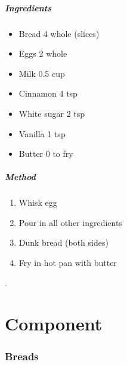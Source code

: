 \documentclass[]{article}
\begin{document}
\subsubsection*{\Large Ingredients}
\begin{multicols}{2}
\begin{itemize}
 \item Bread \hfill 4 whole (slices)
 \item Eggs \hfill 2 whole
 \item Milk \hfill 0.5 cup
 \item Cinnamon \hfill 4 tsp
 \item White sugar \hfill 2 tsp
 \item Vanilla \hfill 1 tsp
 \item Butter \hfill 0 to fry
\end{itemize}
\end{multicols}
\subsubsection*{\Large Method}
\begin{enumerate}[font=\huge\color{accent}]
	\item Whisk egg
	\item Pour in all other ingredients
	\item Dunk bread (both sides)
	\item Fry in hot pan with butter
\end{enumerate}
\newpage

\newpage
\color{white}.\color{black}
\vspace{5cm}
\part{\Huge Component}
\newpage
{}
\section*{\center\Huge\color{accent}Breads}
\label{cat:Breads}
\label{rec:Beer Bread}
\end{document}
